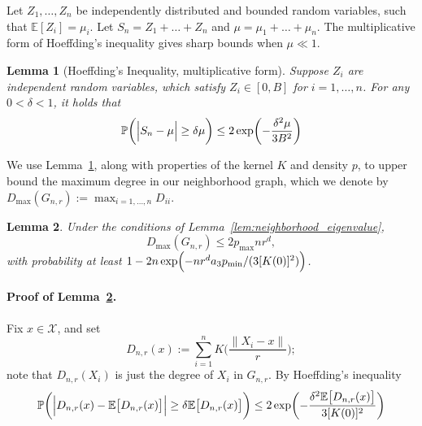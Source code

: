 \documentclass[twoside]{article}
\newcommand{\1}{\mathbf{1}}
\newcommand{\Xset}{\mathcal{X}}
\newcommand{\Pbb}{\mathbb{P}}
\newcommand{\Ebb}{\mathbb{E}}
\newtheorem{lemma}{Lemma}
\theoremstyle{definition}
\theoremstyle{remark}
\begin{document}
Let $Z_1,\ldots,Z_n$ be independently distributed and bounded random variables, such that $\Ebb[Z_i] = \mu_i$. Let $S_n = Z_1 + \ldots + Z_n$ and $\mu = \mu_1 + \ldots + \mu_n$. The multiplicative form of Hoeffding's inequality gives sharp bounds when $\mu \ll 1$. 
\begin{lemma}[Hoeffding's Inequality, multiplicative form]
	\label{lem:hoeffding}
	Suppose $Z_i$ are independent random variables, which satisfy $Z_i \in [0,B]$ for $i = 1,\ldots,n$. For any $0 < \delta < 1$, it holds that
	\begin{equation*}
	\Pbb\biggl(\Bigl|S_n - \mu\Bigr| \geq \delta \mu\biggr) \leq 2\exp\biggl(-\frac{\delta^2\mu}{3B^2}\biggr)
	\end{equation*}
\end{lemma}
We use Lemma~\ref{lem:hoeffding}, along with properties of the kernel $K$ and density $p$, to upper bound the maximum degree in our neighborhood graph, which we denote by $D_{\max}(G_{n,r}) := \max_{i = 1,\ldots,n} D_{ii}$.
\begin{lemma}
	\label{lem:max_degree}
	Under the conditions of Lemma~\ref{lem:neighborhood_eigenvalue},
	\begin{equation*}
	D_{\max}(G_{n,r}) \leq 2p_{\max}nr^d,
	\end{equation*}
	with probability at least $1 - 2n\exp\Bigl(-nr^da_3p_{\min}/(3[K(0)]^2)\Bigr)$. 
\end{lemma}
\paragraph{Proof of Lemma~\ref{lem:max_degree}.}
Fix $x \in \Xset$, and set
\begin{equation*}
D_{n,r}(x) :=  \sum_{i = 1}^{n} K\biggl(\frac{\|X_i - x\|}{r}\biggr);
\end{equation*}
note that $D_{n,r}(X_i)$ is just the degree of $X_i$ in $G_{n,r}$. By Hoeffding's inequality
\begin{equation}
\label{pf:max_degree_1}
\Pbb\biggl(\Bigl|D_{n,r}(x) - \Ebb\bigl[D_{n,r}(x)\bigr]\Bigr| \geq \delta \Ebb\bigl[D_{n,r}(x)\bigr]\biggr) \leq 2\exp\biggl(-\frac{\delta^2\Ebb\bigl[D_{n,r}(x)\bigr]}{3[K(0)]^2}\biggr)
\end{equation}
\end{document}
